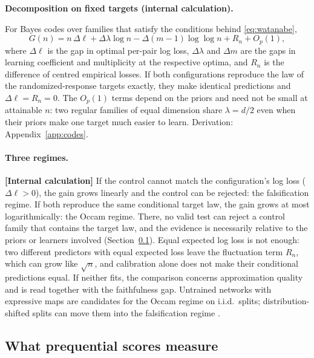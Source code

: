 \documentclass[11pt,a4paper]{article}
\newcommand{\evl}[2]{{\small\bfseries\color{#1}[#2]}}
\newcommand{\LCalc}{\evl{ccalc}{Internal calculation}}
\newenvironment{keybox}[1]{%
  \def\FrameCommand{{\color{ccalc}\vrule width 1.6pt}\hspace{8pt}}%
  \MakeFramed{\advance\hsize-\width\FrameRestore}%
  \noindent\textbf{#1}\par\smallskip\noindent\ignorespaces}{\endMakeFramed}
\begin{document}
\begin{keybox}{Decomposition on fixed targets (internal calculation).}
For Bayes codes over families that satisfy the conditions behind
\eqref{eq:watanabe},
\begin{equation}
G(n)=n\,\Delta\ell+\Delta\lambda\log n-\Delta(m-1)\log\log n+R_n+O_p(1),
\label{eq:gain}
\end{equation}
where $\Delta\ell$ is the gap in optimal per-pair log loss, $\Delta\lambda$
and $\Delta m$ are the gaps in learning coefficient and multiplicity at the
respective optima, and $R_n$ is the difference of centred empirical losses.
If both configurations reproduce the law of the randomized-response targets
exactly, they make identical predictions and $\Delta\ell=R_n=0$. The
$O_p(1)$ terms depend on the priors and need not be small at attainable
$n$: two regular families of equal dimension share $\lambda=d/2$ even when
their priors make one target much easier to learn. Derivation:
Appendix~\ref{app:codes}.
\end{keybox}

\paragraph{Three regimes.} \LCalc{} If the control cannot match the
configuration's log loss ($\Delta\ell>0$), the gain grows linearly and the
control can be rejected: the falsification regime. If both reproduce the same conditional target law, the gain grows at most logarithmically: the Occam regime. There, no valid test can reject a
control family that contains the target law, and the evidence is
necessarily relative to the priors or learners involved (Section~\ref{sec:atests}). Equal expected log loss is not enough: two different predictors with equal expected loss leave the fluctuation term $R_n$, which can grow like $\sqrt n$, and calibration alone does not make their conditional predictions equal. If neither fits, the comparison concerns
approximation quality and is read together with the faithfulness gap.
Untrained networks with expressive maps are candidates for the Occam
regime on i.i.d.\ splits; distribution-shifted splits can move them into
the falsification regime \cite{sutter2025}.

\subsection{What prequential scores measure}
\label{sec:atests}
\end{document}
